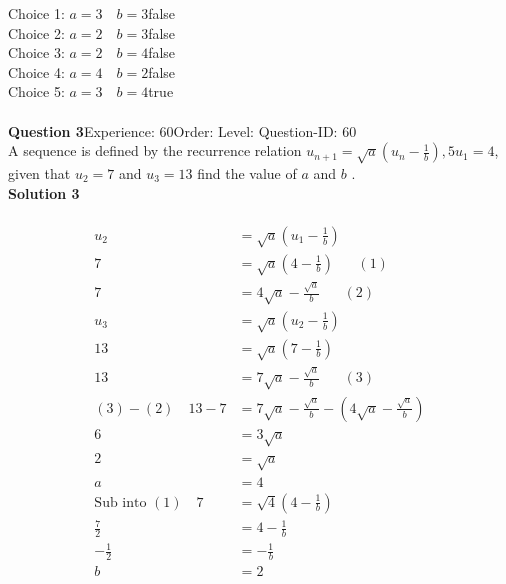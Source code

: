 \documentclass{article}
\begin{document}
Choice 1: \hspace{20pt}$a=3\quad b=3$\hspace{20pt}false\\
Choice 2: \hspace{20pt}$a=2\quad b=3$\hspace{20pt}false\\
Choice 3: \hspace{20pt}$a=2\quad b=4$\hspace{20pt}false\\
Choice 4: \hspace{20pt}$a=4\quad b=2$\hspace{20pt}false\\
Choice 5: \hspace{20pt}$a=3\quad b=4$\hspace{20pt}true\\
\\[4pt]
\noindent\textbf{Question 3}\hspace{20pt}Experience: 60\hspace{20pt}Order: \hspace{20pt}Level: \hspace{20pt}Question-ID: 60\\[2pt]
A sequence is defined by the recurrence relation $u_{n+1}=\sqrt{a}\left(u_n-\displaystyle\frac{1}{b}\right),5 u_1=4$, given that $u_2=7$ and $u_3=13$ find the value of $a$ and $b$ .\\[4pt]
\noindent\textbf{Solution 3}\\[2pt]
\\[-35pt]\begin{align*}
u_2&=\sqrt{a}\left(u_1-\displaystyle\frac{1}{b}\right)\\[2pt]
7&=\sqrt{a}\left(4-\displaystyle\frac{1}{b}\right)\hspace{20pt}(1)\\[2pt]
7&=4\sqrt{a}-\displaystyle\frac{\sqrt{a}}{b}\hspace{20pt}(2)\\[12pt]
u_3&=\sqrt{a}\left(u_2-\displaystyle\frac{1}{b}\right)\\[2pt]
13&=\sqrt{a}\left(7-\displaystyle\frac{1}{b}\right)\\[2pt]
13&=7\sqrt{a}-\displaystyle\frac{\sqrt{a}}{b}\hspace{20pt}(3)\\[12pt]
(3)-(2)\quad13-7&=7\sqrt{a}-\displaystyle\frac{\sqrt{a}}{b}-\left(4\sqrt{a}-\displaystyle\frac{\sqrt{a}}{b}\right)\\[2pt]
6&=3\sqrt{a}\\[2pt]
2&=\sqrt{a}\\[2pt]
a&=4\\[12pt]
\text{Sub into} \,\,(1)\quad 7&=\sqrt{4}\left(4-\displaystyle\frac{1}{b}\right)\\[2pt]
\displaystyle\frac{7}{2}&=4-\displaystyle\frac{1}{b}\\[2pt]
-\displaystyle\frac{1}{2}&=-\displaystyle\frac{1}{b}\\[2pt]
b&=2
\end{align*}
\end{document}

